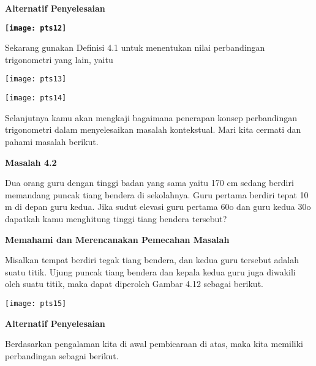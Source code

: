 \documentclass[11pt,fleqn]{book} %
\begin{document}
\noindent 

\noindent \textbf{Alternatif Penyelesaian}

\noindent \textbf{}

\noindent \textbf{\texttt{[image: pts12]}}

\noindent 

\noindent Sekarang gunakan Definisi 4.1 untuk menentukan nilai perbandingan trigonometri yang lain, yaitu

\noindent 

\noindent \texttt{[image: pts13]}

\noindent \texttt{[image: pts14]}

\noindent 

\noindent Selanjutnya kamu akan mengkaji bagaimana penerapan konsep perbandingan trigonometri dalam menyelesaikan masalah kontekstual. Mari kita cermati dan pahami masalah berikut.

\noindent 

\noindent \textbf{Masalah 4.2}

\noindent \textbf{}

\noindent Dua orang guru dengan tinggi badan yang sama yaitu 170 cm sedang berdiri memandang puncak tiang bendera di sekolahnya. Guru pertama berdiri tepat 10 m di depan guru kedua. Jika sudut elevasi guru pertama 60o dan guru kedua 30o dapatkah kamu menghitung tinggi tiang bendera tersebut?

\noindent 

\noindent \textbf{Memahami dan Merencanakan Pemecahan Masalah}

\noindent \textbf{}

\noindent Misalkan tempat berdiri tegak tiang bendera, dan kedua guru tersebut adalah suatu titik. Ujung puncak tiang bendera dan kepala kedua guru juga diwakili oleh suatu titik, maka dapat diperoleh Gambar 4.12 sebagai berikut.

\noindent 

\noindent \texttt{[image: pts15]}

\noindent 

\noindent \textbf{Alternatif Penyelesaian}

\noindent \textbf{}

\noindent Berdasarkan pengalaman kita di awal pembicaraan di atas, maka kita memiliki perbandingan sebagai berikut.
\end{document}
